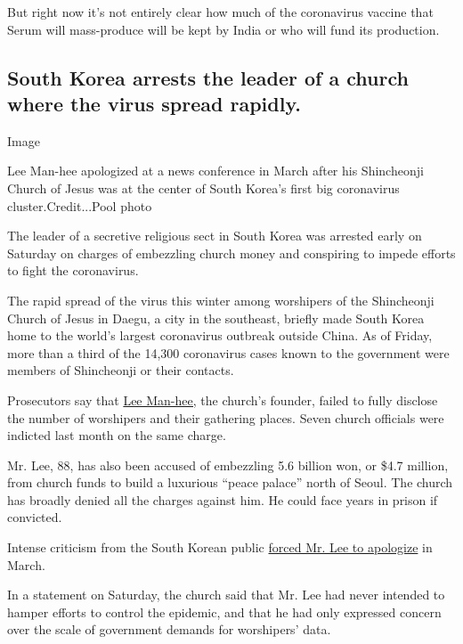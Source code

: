 But right now it's not entirely clear how much of the coronavirus
vaccine that Serum will mass-produce will be kept by India or who will
fund its production.

\hypertarget{south-korea-arrests-the-leader-of-a-church-where-the-virus-spread-rapidly}{%
\subsection{South Korea arrests the leader of a church where the virus
spread
rapidly.}\label{south-korea-arrests-the-leader-of-a-church-where-the-virus-spread-rapidly}}

Image

Lee Man-hee apologized at a news conference in March after his
Shincheonji Church of Jesus was at the center of South Korea's first big
coronavirus cluster.Credit...Pool photo

The leader of a secretive religious sect in South Korea was arrested
early on Saturday on charges of embezzling church money and conspiring
to impede efforts to fight the coronavirus.

The rapid spread of the virus this winter among worshipers of the
Shincheonji Church of Jesus in Daegu, a city in the southeast, briefly
made South Korea home to the world's largest coronavirus outbreak
outside China. As of Friday, more than a third of the 14,300 coronavirus
cases known to the government were members of Shincheonji or their
contacts.

Prosecutors say that
\href{https://www.nytimes.com/2020/03/02/world/asia/coronavirus-south-korea-shincheonji.html?searchResultPosition=1}{Lee
Man-hee,} the church's founder, failed to fully disclose the number of
worshipers and their gathering places. Seven church officials were
indicted last month on the same charge.

Mr. Lee, 88, has also been accused of embezzling 5.6 billion won, or
\$4.7 million, from church funds to build a luxurious ``peace palace''
north of Seoul. The church has broadly denied all the charges against
him. He could face years in prison if convicted.

Intense criticism from the South Korean public
\href{https://www.nytimes.com/2020/03/02/world/asia/coronavirus-south-korea-shincheonji.html}{forced
Mr. Lee to apologize} in March.

In a statement on Saturday, the church said that Mr. Lee had never
intended to hamper efforts to control the epidemic, and that he had only
expressed concern over the scale of government demands for worshipers'
data.

